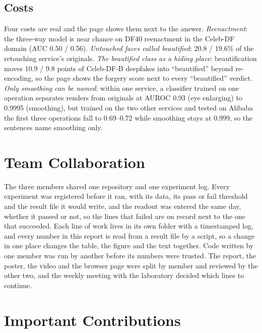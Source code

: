\documentclass[conference,a4paper]{IEEEtran}
\begin{document}
\subsection{Costs}
\label{sec:costs}

Four costs are real and the page shows them next to the answer. \emph{Reenactment}: the three-way model is near chance on DF40
reenactment in the Celeb-DF domain (AUC 0.50 / 0.56). \emph{Untouched faces called beautified}: 20.8 / 19.6\% of the retouching
service's originals. \emph{The beautified class as a hiding place}: beautification moves 10.9 / 9.8 points of Celeb-DF-B
deepfakes into ``beautified'' beyond re-encoding, so the page shows the forgery score next to every ``beautified'' verdict.
\emph{Only smoothing can be named}: within one service, a classifier trained on one operation separates renders from
originals at AUROC 0.93 (eye enlarging) to 0.9995 (smoothing), but trained on the two other services and tested on Alibaba
the first three operations fall to 0.69--0.72 while smoothing stays at 0.999, so the sentences name smoothing only.

\section{Team Collaboration}

The three members shared one repository and one experiment log. Every experiment was registered before it ran, with its
data, its pass or fail threshold and the result file it would write, and the readout was entered the same day, whether it
passed or not, so the lines that failed are on record next to the one that succeeded.
Each line of work lives in its own folder with a timestamped log, and every number in this report is read from a result file
by a script, so a change in one place changes the table, the figure and the text together. Code written by one member was
run by another before its numbers were trusted. The report, the poster, the video and the browser page were split by
member and reviewed by the other two, and the weekly meeting with the laboratory decided which lines to continue.

\section{Important Contributions}
\end{document}
